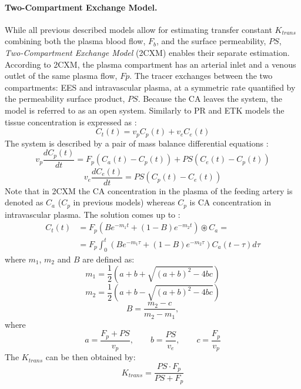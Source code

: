 \paragraph{Two-Compartment Exchange Model.}While all previous described models allow for estimating transfer constant $K_{trans}$ combining both the plasma blood flow, $F_b$, and the surface permeability, $PS$, \textit{Two-Compartment Exchange Model} (2CXM) enables their separate estimation. 
According to 2CXM, the plasma compartment has an arterial inlet and a venous outlet of the same plasma flow, $Fp$. 
The tracer exchanges between the two compartments: EES and intravascular plasma, at a symmetric rate quantified by the permeability surface product, $PS$.
Because the CA leaves the system, the model is referred to as an open system. 
Similarly to PR and ETK models the tissue concentration is expressed as \cite{khalifa2014models}:
\begin{equation}
C_t(t) = v_pC_p(t) + v_eC_e(t)
\label{eq:2cxm}
\end{equation}
The system is described by a pair of mass balance differential equations \cite{khalifa2014models}:  
\begin{equation}
v_p\frac{dC_p(t)}{dt} = F_p(C_a(t)-C_p(t))+PS(C_e(t)-C_p(t))
\label{eq:2cxm2}
\end{equation}
\begin{equation}
v_e\frac{dC_e(t)}{dt} = PS(C_p(t)-C_e(t))
\label{eq:2cxm3}
\end{equation}
Note that in 2CXM the CA concentration in the plasma of the feeding artery is denoted as $C_a$ ($C_p$ in previous models) whereas $C_p$ is CA concentration in intravascular plasma. The solution comes up to \cite{khalifa2014models}:
\begin{align}
	\label{eq:2cxm4}
	\nonumber C_{t}(t) &=F_p (Be^{-m_1t}+(1-B)e^{-m_2t})\circledast C_a =\\
	&= F_{p} \int_{0}^{t} \left( Be^{-m_1\tau} + (1-B)e^{-m_2\tau} \right) C_{a}(t-\tau)d\tau
\end{align}
where $m_1$, $m_2$ and $B$ are defined as:
\begin {equation} 
m_1 = \frac{1}{2}\left( a+b+\sqrt{(a+b)^2-4bc}\right)
\end{equation}
\begin {equation} 
\nonumber m_2 = \frac{1}{2}\left(a+b-\sqrt{(a+b)^2-4bc}\right)
\end{equation}
\begin {equation} 
\nonumber B = \frac{m_2-c}{m_2-m_1}, 
\end{equation}
where
\begin{equation}
a = \frac{F_p+PS}{v_p},\qquad b = \frac{PS}{v_e},\qquad c = \frac{F_p}{v_p}
\end{equation}
The $K_{trans}$ can be then obtained by:
\begin{equation}
K_{trans} = \frac{PS\cdot{}F_p}{PS+F_p}
\end{equation}


